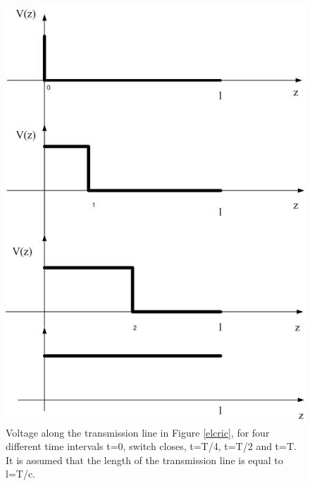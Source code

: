 \documentclass{ximera}
\begin{document}
\begin{figure}[htbp]
\begin{center}
\includegraphics[scale=0.5]{../jpg/timedelayedsignaltl.jpg}
\end{center}
\caption{Voltage along the transmission line in Figure \ref{elcric}, for four different time intervals t=0, switch closes, t=T/4, t=T/2 and t=T. It is assumed that the length of the transmission line is equal to l=T/c.}
\label{delayedsig}
\end{figure}
\end{document}
